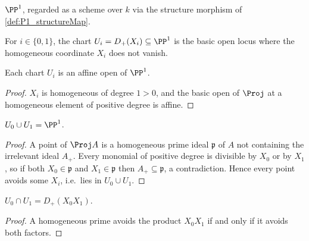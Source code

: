 \begin{definition}
  \label{def:P1_asOver}
  \leanok
  \(\PP^1\), regarded as a scheme over \(k\) via the structure morphism of
  \ref{def:P1_structureMap}.
\end{definition}

\begin{definition}
  \label{def:P1_chartOpen}
  \leanok
  For \(i \in \{0,1\}\), the chart \(U_i = D_+(X_i) \subseteq \PP^1\) is the basic open locus
  where the homogeneous coordinate \(X_i\) does not vanish.
\end{definition}

\begin{lemma}
  \label{lem:P1_chartOpen_affine}
  \leanok
  Each chart \(U_i\) is an affine open of \(\PP^1\).
\end{lemma}
\begin{proof}
  \leanok
  \(X_i\) is homogeneous of degree \(1 > 0\), and the basic open of \(\Proj\) at a homogeneous
  element of positive degree is affine.
\end{proof}

\begin{lemma}
  \label{lem:P1_chartOpen_sup}
  \leanok
  \(U_0 \cup U_1 = \PP^1\).
\end{lemma}
\begin{proof}
  \leanok
  A point of \(\Proj A\) is a homogeneous prime ideal \(\mathfrak p\) of \(A\) not containing
  the irrelevant ideal \(A_+\). Every monomial of positive degree is divisible by \(X_0\) or
  by \(X_1\), so if both \(X_0 \in \mathfrak p\) and \(X_1 \in \mathfrak p\) then
  \(A_+ \subseteq \mathfrak p\), a contradiction. Hence every point avoids some \(X_i\), i.e.\
  lies in \(U_0 \cup U_1\).
\end{proof}

\begin{lemma}
  \label{lem:P1_chartOpen_inf}
  \leanok
  \(U_0 \cap U_1 = D_+(X_0 X_1)\).
\end{lemma}
\begin{proof}
  \leanok
  A homogeneous prime avoids the product \(X_0 X_1\) if and only if it avoids both factors.
\end{proof}

